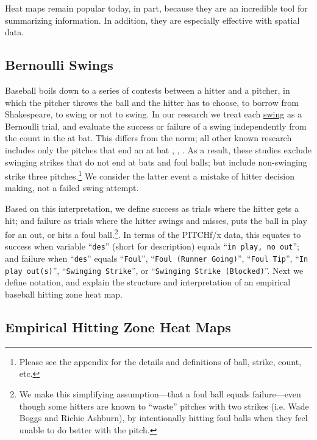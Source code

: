 Heat maps remain popular today, in part, because they are an incredible tool for summarizing information. In addition, they are especially effective with spatial data.

\subsection{Bernoulli Swings}

Baseball boils down to a series of contests between a hitter and a pitcher, in which the pitcher throws the ball and the hitter has to choose, to borrow from Shakespeare, to swing or not to swing. In our research we treat each \underline{swing} as a Bernoulli trial, and evaluate the success or failure of a swing independently from the count in the at bat. This differs from the norm; all other known research includes only the pitches that end an at bat \citep{Cross2015}, \citep{Baumer2010}, \citep{Fast2011}. As a result, these studies exclude swinging strikes that do not end at bats and foul balls; but include non-swinging strike three pitches.\footnote{Please see the appendix for the details and definitions of ball, strike, count, etc.} We consider the latter event a mistake of hitter decision making, not a failed swing attempt. 

Based on this interpretation, we define success as trials where the hitter gets a hit; and failure as trials where the hitter swings and misses, puts the ball in play for an out, or hits a foul ball.\footnote{We make this simplifying assumption---that a foul ball equals failure---even though some hitters are known to ``waste'' pitches with two strikes (i.e. Wade Boggs and Richie Ashburn), by intentionally hitting foul balls when they feel unable to do better with the pitch. }. In terms of the PITCHf/x\textsuperscript{\textregistered} data, this equates to success when variable ``\verb|des|'' (short for description)  equals ``\verb|in play, no out|''; and failure when ``\verb|des|'' equals ``\verb|Foul|'', ``\verb|Foul (Runner Going)|'', ``\verb|Foul Tip|'', ``\verb|In play out(s)|'', ``\verb|Swinging Strike|'', or ``\verb|Swinging Strike (Blocked)|''. Next we define notation, and explain the structure and interpretation of an empirical baseball hitting zone heat map.

\subsection{Empirical Hitting Zone Heat Maps} \label{EHZHM}


